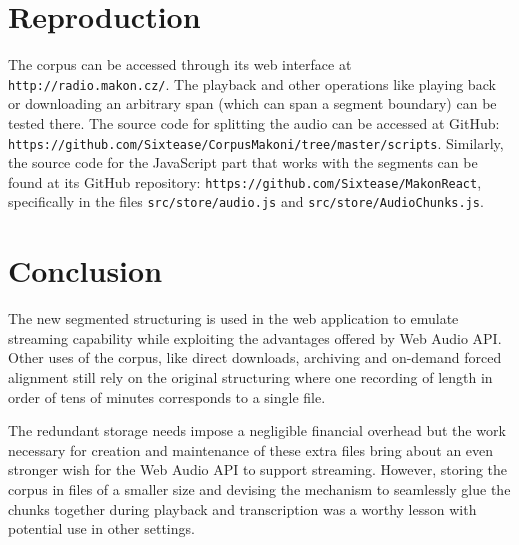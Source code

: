 \documentclass[runningheads]{llncs}
\begin{document}
\section{Reproduction}

The corpus can be accessed through its web interface at
\texttt{http://radio.makon.cz/}. The playback and other operations like playing
back or downloading an arbitrary span (which can span a segment boundary) can be
tested there. The source code for splitting the audio can be accessed at
GitHub: \\
\texttt{https://github.com/Sixtease/CorpusMakoni/tree/master/scripts}.
Similarly, the source code for the JavaScript part that works with the segments
can be found at its GitHub repository:
\texttt{https://github.com/Sixtease/MakonReact}, specifically in the files
\texttt{src/store/audio.js} and \texttt{src/store/AudioChunks.js}.

\section{Conclusion}

The new segmented structuring is used in the web application to emulate streaming capability while exploiting the advantages offered by Web Audio API. Other uses of the corpus, like direct downloads, archiving and on-demand forced alignment still rely on the original structuring where one recording of length in order of tens of minutes corresponds to a single file.

The redundant storage needs impose a negligible financial overhead but the work necessary for creation and maintenance of these extra files bring about an even stronger wish for the Web Audio API to support streaming. However, storing the corpus in files of a smaller size and devising the mechanism to seamlessly glue the chunks together during playback and transcription was a worthy lesson with potential use in other settings.




\end{document}
